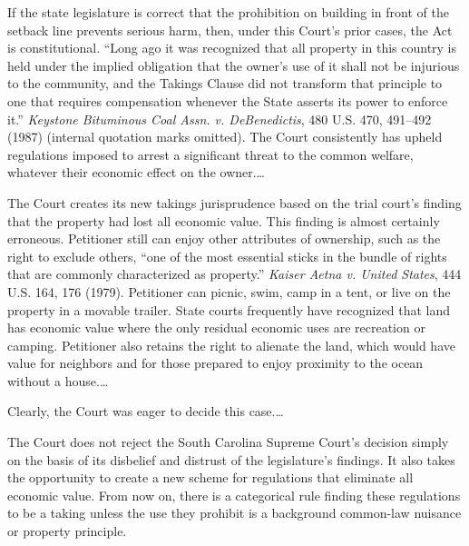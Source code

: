 If the state legislature is correct that the prohibition on building in front of
the setback line prevents serious harm, then, under this Court's prior cases,
the Act is constitutional. ``Long ago it was recognized that all property in
this country is held under the implied obligation that the owner's use of it
shall not be injurious to the community, and the Takings Clause did not
transform that principle to one that requires compensation whenever the State
asserts its power to enforce it.'' \textit{Keystone Bituminous Coal Assn. v.
DeBenedictis}, 480 U.S. 470, 491--492 (1987) (internal quotation marks omitted).
The Court consistently has upheld regulations imposed to arrest a significant
threat to the common welfare, whatever their economic effect on the owner.\ldots

The Court creates its new takings jurisprudence based on the trial court's
finding that the property had lost all economic value. This finding is almost
certainly erroneous. Petitioner still can enjoy other attributes of ownership,
such as the right to exclude others, ``one of the most essential sticks in the
bundle of rights that are commonly characterized as property.'' \textit{Kaiser
Aetna v. United States}, 444 U.S. 164, 176 (1979). Petitioner can picnic, swim,
camp in a tent, or live on the property in a movable trailer. State courts
frequently have recognized that land has economic value where the only residual
economic uses are recreation or camping. Petitioner also retains the right to
alienate the land, which would have value for neighbors and for those prepared
to enjoy proximity to the ocean without a house.\ldots

Clearly, the Court was eager to decide this case.\ldots

The Court does not reject the South Carolina Supreme Court's decision simply on
the basis of its disbelief and distrust of the legislature's findings. It also
takes the opportunity to create a new scheme for regulations that eliminate all
economic value. From now on, there is a categorical rule finding these
regulations to be a taking unless the use they prohibit is a background
common-law nuisance or property principle.

